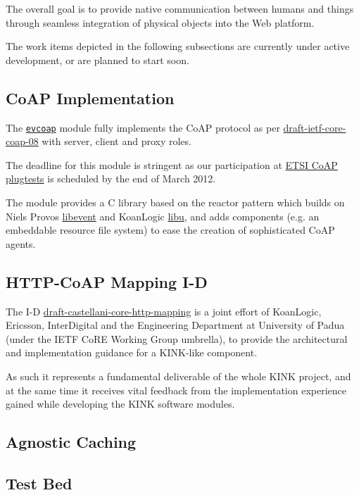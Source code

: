 \documentclass[12pt]{article}
\newcommand{\swmod}[1]{\mbox{\texttt{#1}}}
\begin{document}
The overall goal is to provide native communication between humans and things through seamless integration of physical objects into the Web platform.

The work items depicted in the following subsections are currently under active development, or are planned to start soon.

\subsection{CoAP Implementation}
The \href{https://github.com/koanlogic/webthings/tree/master/bits/evcoap}{\swmod{evcoap}} module fully implements the CoAP protocol as per \href{http://tools.ietf.org/html/draft-ietf-core-coap}{draft-ietf-core-coap-08} with server, client and proxy roles.

The deadline for this module is stringent as our participation at \href{http://www.etsi.org/plugtests/coap/coap.htm}{ETSI CoAP plugtests} is scheduled by the end of March 2012.

The module provides a C library based on the reactor pattern which builds on Niels Provos \href{http://libevent.org}{libevent} and KoanLogic \href{http://koanlogic.com/libu}{libu}, and adds components (e.g. an embeddable resource file system) to ease the creation of sophisticated CoAP agents.

\subsection{HTTP-CoAP Mapping I-D}
The I-D \href{http://tools.ietf.org/html/draft-castellani-core-http-mapping}{draft-castellani-core-http-mapping} is a joint effort of \mbox{KoanLogic}, \mbox{Ericsson}, \mbox{InterDigital} and the Engineering Department at University of Padua (under the IETF CoRE Working Group umbrella), to provide the architectural and implementation guidance for a KINK-like component.

As such it represents a fundamental deliverable of the whole KINK project, and at the same time it receives vital feedback from the implementation experience gained while developing the KINK software modules.

\subsection{Agnostic Caching}


\subsection{Test Bed}

\end{document}
